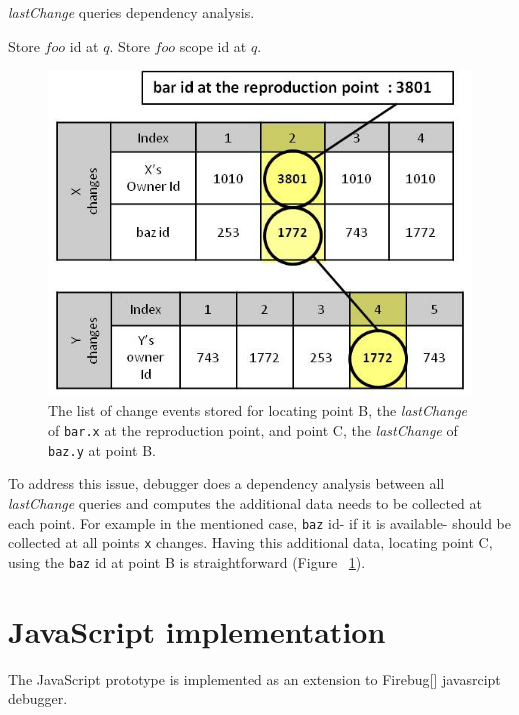 \documentclass[preprint]{sigplanconf}
\begin{document}
\begin{algorithm}
\caption{\textit{lastChange} queries dependency analysis.}
\label{dependency-analysis}
\begin{algorithmic}

     
     \STATE Store $foo$ id at $q$. 
   \ELSE %
     \STATE Store $foo$ scope id at $q$.
	 \ENDIF 
 \ENDFOR 
\ENDFOR

\end{algorithmic}
\end{algorithm}

\begin{figure}[htp]
\includegraphics[width=.48\textwidth]{8-lastchange-lastchange.jpg}
\caption{The list of change events stored for locating point B, the \textit{lastChange} of \texttt{bar.x} at the reproduction point, and point C, the \textit{lastChange} of  \texttt{baz.y} at point B.}
\label{fig:lastchange-lastchange}
\end{figure}

To address this issue, debugger does a dependency analysis between all \textit{lastChange} queries and computes the additional data needs to be collected at each point. For example in the mentioned case, \texttt{baz} id- if it is available- should be collected at all points \texttt{x} changes. Having this additional data, locating point C, using the \texttt{baz} id at point B is straightforward (Figure ~\ref{fig:lastchange-lastchange}).


\section{JavaScript implementation}
The JavaScript prototype is implemented as an extension to Firebug[] javasrcipt debugger. 
\end{document}

